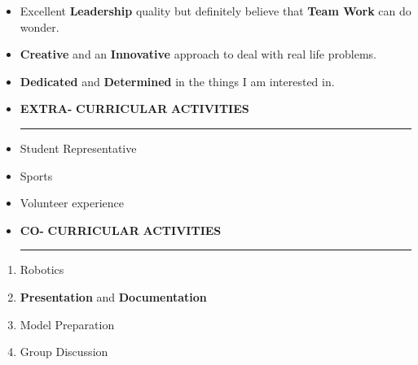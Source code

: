 \documentclass[a4paper]{article}
\begin{document}
 \renewcommand{\labelitemi}{\textbullet}
 \begin{itemize}
   \item Excellent \textbf{Leadership} quality but definitely believe that \textbf{Team Work} can do wonder.
   \item \textbf{Creative} and an \textbf{Innovative} approach to deal with real life problems.
   \item \textbf{Dedicated} and \textbf{Determined} in the things I am interested in.
 \end{itemize}
 \renewcommand{\labelitemi}{\texttt{[image: jnj.JPG]}}
\begin{itemize}
  \vspace{4ex}
  \item \textbf{\huge{E}}\textbf{\large XTRA-} \textbf{\huge{C}}\textbf{\large URRICULAR}
  \textbf{\huge{A}}\textbf{\large CTIVITIES}
  {\color{mypink1}
  \rule{6.5cm}{0.5mm}}
 \end{itemize}
 \renewcommand{\labelitemi}{\textbullet}
\begin{itemize}
  \item Student Representative
  \item Sports
  \item Volunteer experience
\end{itemize}
 \renewcommand{\labelitemi}{\texttt{[image: jnj.JPG]}}
\begin{itemize}
  \vspace{4ex}
  \item \textbf{\huge{C}}\textbf{\large O-} \textbf{\huge{C}}\textbf{\large URRICULAR}
  \textbf{\huge{A}}\textbf{\large CTIVITIES}
  {\color{mypink1}
  \rule{7.5cm}{0.5mm}}
 \end{itemize}
 \renewcommand{\labelitemi}{\textbullet}
\begin{enumerate}
  \item Robotics
  \item \textbf{Presentation} and \textbf{Documentation}
  \item Model Preparation
  \item Group Discussion
\end{enumerate}
  
\end{document}
